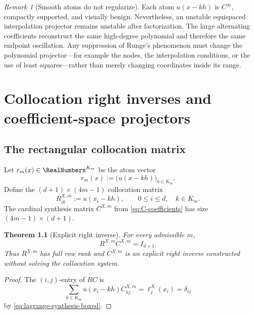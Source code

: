 \documentclass[11pt,oneside]{book}
\newtheorem{theorem}{Theorem}[chapter]
\theoremstyle{definition}
\theoremstyle{remark}
\newtheorem{remark}[theorem]{Remark}
\begin{document}
\begin{remark}[Smooth atoms do not regularize]
Each atom \(u(x-kh)\) is \(C^\infty\), compactly supported, and visually benign.  Nevertheless, an unstable equispaced interpolation projector remains unstable after factorization.  The large alternating coefficients reconstruct the same high-degree polynomial and therefore the same endpoint oscillation.  Any suppression of Runge's phenomenon must change the polynomial projector---for example the nodes, the interpolation conditions, or the use of least squares---rather than merely changing coordinates inside its range.
\end{remark}

\chapter{Collocation right inverses and coefficient-space projectors}
\label{ch:matrices}

\section{The rectangular collocation matrix}
Let \(r_m(x)\in\RealNumbers^{K_m}\) be the atom vector
\begin{equation}
 r_m(x):=\bigl(u(x-kh)\bigr)_{k\in K_m}.
 \label{eq:atom-vector}
\end{equation}
Define the \((d+1)\times(4m-1)\) collocation matrix
\begin{equation}
 R^{X,m}_{ik}:=u(x_i-kh),
 \qquad 0\le i\le d,
 \quad k\in K_m.
 \label{eq:collocation-matrix}
\end{equation}
The cardinal synthesis matrix \(C^{X,m}\) from \cref{eq:C-coefficients} has size \((4m-1)\times(d+1)\).

\begin{theorem}[Explicit right inverse]
\label{thm:right-inverse}
For every admissible \(m\),
\begin{equation}
 \boxed{R^{X,m}C^{X,m}=I_{d+1}.}
 \label{eq:right-inverse}
\end{equation}
Thus \(R^{X,m}\) has full row rank and \(C^{X,m}\) is an explicit right inverse constructed without solving the collocation system.
\end{theorem}

\begin{proof}
The \((i,j)\)-entry of \(RC\) is
\[
 \sum_{k\in K_m}u(x_i-kh)C_{kj}^{X,m}
 =\ell_j^X(x_i)=\delta_{ij}
\]
by \cref{eq:lagrange-synthesis-boxed}.
\end{proof}
\end{document}
